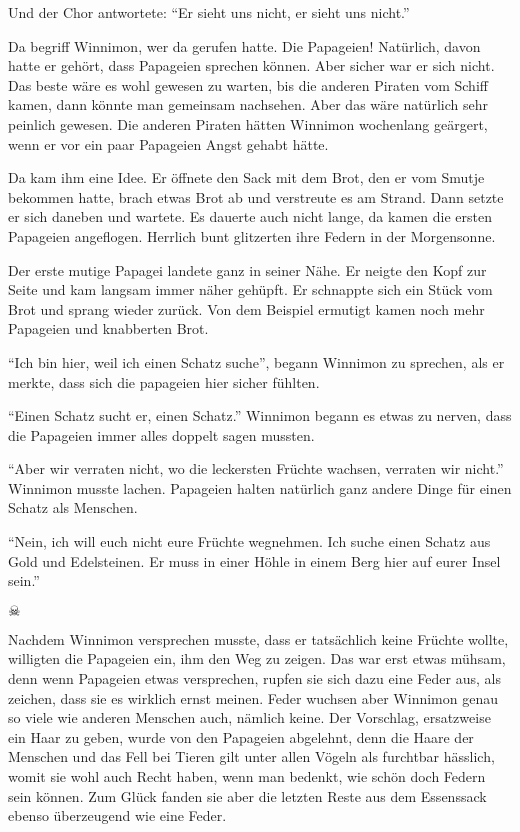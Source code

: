 Und der Chor antwortete: \enquote{Er sieht uns nicht, er sieht uns nicht.}

Da begriff Winnimon, wer da gerufen hatte. Die Papageien! Natürlich, davon hatte er gehört, dass Papageien sprechen können. Aber sicher war er sich nicht. Das beste wäre es wohl gewesen zu warten, bis die anderen Piraten vom Schiff kamen, dann könnte man gemeinsam nachsehen. Aber das wäre natürlich sehr peinlich gewesen. Die anderen Piraten hätten Winnimon wochenlang geärgert, wenn er vor ein paar Papageien Angst gehabt hätte. 

Da kam ihm eine Idee. Er öffnete den Sack mit dem Brot, den er vom Smutje bekommen hatte, brach etwas Brot ab und verstreute es am Strand. Dann setzte er sich daneben und wartete. Es dauerte auch nicht lange, da kamen die ersten Papageien angeflogen. Herrlich bunt glitzerten ihre Federn in der Morgensonne.

Der erste mutige Papagei landete ganz in seiner Nähe. Er neigte den Kopf zur Seite und kam langsam immer näher gehüpft. Er schnappte sich ein Stück vom Brot und sprang wieder zurück. Von dem Beispiel ermutigt kamen noch mehr Papageien und knabberten Brot. 

\enquote{Ich bin hier, weil ich einen Schatz suche}, begann Winnimon zu sprechen, als er merkte, dass sich die papageien hier sicher fühlten. 

\enquote{Einen Schatz sucht er, einen Schatz.} Winnimon begann es etwas zu nerven, dass die Papageien immer alles doppelt sagen mussten.

\enquote{Aber wir verraten nicht, wo die leckersten Früchte wachsen, verraten wir nicht.} Winnimon musste lachen. Papageien halten natürlich ganz andere Dinge für einen Schatz als Menschen.

\enquote{Nein, ich will euch nicht eure Früchte wegnehmen. Ich suche einen Schatz aus Gold und Edelsteinen. Er muss in einer Höhle in einem Berg hier auf eurer Insel sein.}

\begin{center}
{\huge $\skull$}
\end{center}

Nachdem Winnimon versprechen musste, dass er tatsächlich keine Früchte wollte, willigten die Papageien ein, ihm den Weg zu zeigen. Das war erst etwas mühsam, denn wenn Papageien etwas versprechen, rupfen sie sich dazu eine Feder aus, als zeichen, dass sie es wirklich ernst meinen. Feder wuchsen aber Winnimon genau so viele wie anderen Menschen auch, nämlich keine. Der Vorschlag, ersatzweise ein Haar zu geben, wurde von den Papageien abgelehnt, denn die Haare der Menschen und das Fell bei Tieren gilt unter allen Vögeln als furchtbar hässlich, womit sie wohl auch Recht haben, wenn man bedenkt, wie schön doch Federn sein können. Zum Glück fanden sie aber die letzten Reste aus dem Essenssack ebenso überzeugend wie eine Feder. 

